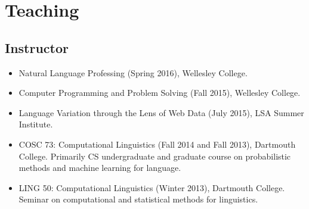 \documentclass[10.5pt,letterpaper]{article}
\begin{document}
%

\section*{Teaching}

\subsection*{Instructor}

\begin{itemize}
\item Natural Language Professing (Spring 2016), Wellesley College.
\item Computer Programming and Problem Solving (Fall 2015), Wellesley College.
\item Language Variation through the Lens of Web Data (July 2015), LSA Summer Institute. 
\item COSC 73: Computational Linguistics (Fall 2014 and Fall 2013), Dartmouth College. Primarily CS undergraduate and graduate course on probabilistic methods and machine learning for language.
\item LING 50: Computational Linguistics (Winter 2013), Dartmouth College. Seminar on computational and statistical methods for linguistics.
\end{itemize}

\end{document}
